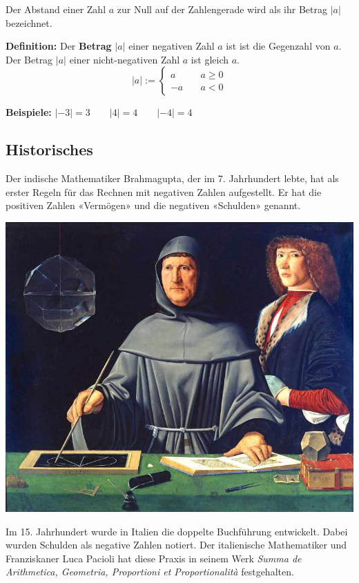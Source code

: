 Der Abstand einer Zahl $a$ zur Null auf der Zahlengerade wird als ihr Betrag $|a|$ bezeichnet.

\textbf{Definition:} Der \textbf{Betrag} $|a|$ einer negativen Zahl $a$ ist ist die Gegenzahl von $a$. Der Betrag $|a|$ einer nicht-negativen Zahl $a$ ist gleich $a$.
\[
  |a| := \begin{cases}
    a &\quad a \geq 0 \\
    -a &\quad a < 0
  \end{cases}
\]
\begin{example}
  \textbf{Beispiele:} $|-3| = 3 \qquad |4| = 4 \qquad |-4| = 4$
\end{example}

\subsection{Historisches}

Der indische Mathematiker Brahmagupta, der im 7. Jahrhundert lebte, hat als erster Regeln für das Rechnen mit negativen Zahlen aufgestellt. Er hat die positiven Zahlen «Vermögen» und die negativen «Schulden» genannt.

\begin{minipage}[t]{0.45\textwidth}
  \vspace{0cm}
  \includegraphics[width=.9\textwidth]{Pacioli.jpg}
\end{minipage}
\begin{minipage}[t]{0.55\textwidth}
  \vspace{0cm}
  Im 15. Jahrhundert wurde in Italien die doppelte Buchführung entwickelt. Dabei wurden Schulden als negative Zahlen notiert. Der italienische Mathematiker und Franziskaner Luca Pacioli hat diese Praxis in seinem Werk \textit{Summa de Arithmetica, Geometria, Proportioni et Proportionalità} festgehalten.
\end{minipage}

